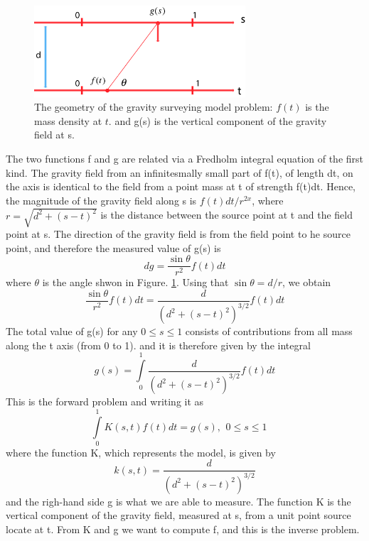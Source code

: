 \documentclass{article}
\begin{document}
 \begin{figure}[h!]
  \centering
    \includegraphics[width=0.7\textwidth]{images/GeophysicsIllustrator/illustrator}
  \caption{The geometry of the gravity surveying model problem: \(f(t)\) is the
  mass density at \(t\). and g(s) is the vertical component of the gravity
  field at s.}
  \label{fig:GeophysicsIllustrator}
\end{figure}
The two functions f and g are related via a Fredholm integral equation of the
first kind. The gravity field from an infinitesmally small part of f(t), of
length dt, on the axis is identical to the field from a point mass at t of
strength f(t)dt. Hence, the magnitude of the gravity field along s is
\(f(t)dt/{r^{2x}}\), where \(r = \sqrt {{d^2} + {{(s - t)}^2}} \) is the
distance between the source point at t and the field point at s. The direction
of the gravity field is from the field point to  he source point, and therefore
the measured value of g(s) is
\[dg = \frac{{\sin \theta }}{{{r^2}}}f(t)dt\]
where \(\theta \) is the angle shwon in Figure. \ref{fig:GeophysicsIllustrator}.
Using that \(\sin \theta  = d/r\), we obtain
\[\frac{{\sin \theta }}{{{r^2}}}f(t)dt = \frac{d}{{{{({d^2} + {{(s -
t)}^2})}^{3/2}}}}f(t)dt\]
The total value of g(s) for any \(0 \le s \le 1\) consists of contributions from
all mass along the t axis (from 0 to 1). and it is therefore given by the
integral
\[g(s) = \int\limits_0^1 {\frac{d}{{{{({d^2} + {{(s - t)}^2})}^{3/2}}}}f(t)dt}
\]
This is the forward problem and writing it as
\begin{equation}
\int\limits_0^1 {K(s,t)f(t)dt = g(s),\begin{array}{*{20}{c}}
{0 \le s \le 1}&{}
\end{array}}
\label{eq:integralequation}
\end{equation}
where the function K, which represents the model, is given by
\begin{equation}
k(s,t) = \frac{d}{{{{({d^2} + {{(s - t)}^2})}^{3/2}}}}
\end{equation}
and the righ-hand side g is what we are able to measure. The function K is the
vertical component of the gravity field, measured at s, from a unit point source
locate at t. From K and g we want to compute f, and this is the inverse problem.
\end{document}
